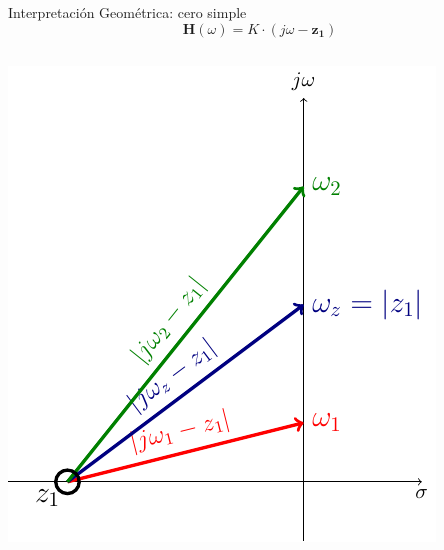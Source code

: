 \documentclass[xcolor={usenames,svgnames,dvipsnames}]{beamer}
\newcommand{\fasor}[1]{\mathbf{#1}(\omega)}
\begin{document}
\begin{frame}[label={sec:org0127f75}]{Interpretación Geométrica: cero simple}
\[
  \fasor{H} = K \cdot (j\omega - \mathbf{z_1})
\]

\begin{columns}
\begin{column}{0.5\columnwidth}
\begin{center}
\includegraphics[width=.9\linewidth]{../figs/CeroGeometrica.pdf}
\end{center}
\end{column}


\end{columns}
\end{frame}
\end{document}
